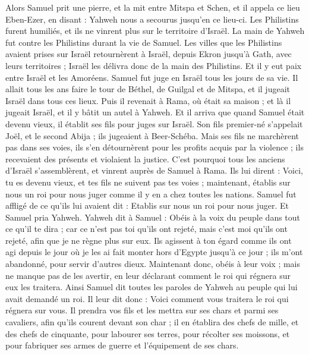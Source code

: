 \begin{multicols}{2}
Alors Samuel prit une pierre, et la mit entre Mitspa et Schen, et il appela ce lieu Eben-Ezer, en disant : Yahweh nous a secourus jusqu'en ce lieu-ci.
Les Philistins furent humiliés, et ils ne vinrent plus sur le territoire d'Israël. La main de Yahweh fut contre les Philistins durant la vie de Samuel.
Les villes que les Philistins avaient prises sur Israël retournèrent à Israël, depuis Ekron jusqu'à Gath, avec leurs territoires ; Israël les délivra donc de la main des Philistins. Et il y eut paix entre Israël et les Amoréens.
Samuel fut juge en Israël tous les jours de sa vie.
Il allait tous les ans faire le tour de Béthel, de Guilgal et de Mitspa, et il jugeait Israël dans tous ces lieux.
Puis il revenait à Rama, où était sa maison ; et là il jugeait Israël, et il y bâtit un autel à Yahweh.
\VerseOne{}Et il arriva que quand Samuel était devenu vieux, il établit ses fils pour juges sur Israël.
Son fils premier-né s'appelait Joël, et le second Abija ; ils jugeaient à Beer-Schéba.
Mais ses fils ne marchèrent pas dans ses voies, ils s'en détournèrent pour les profits acquis par la violence ; ils recevaient des présents et violaient la justice.
C'est pourquoi tous les anciens d'Israël s'assemblèrent, et vinrent auprès de Samuel à Rama.
Ils lui dirent : Voici, tu es devenu vieux, et tes fils ne suivent pas tes voies ; maintenant, établis sur nous un roi pour nous juger comme il y en a chez toutes les nations.
Samuel fut affligé de ce qu'ils lui avaient dit : Etablis sur nous un roi pour nous juger. Et Samuel pria Yahweh.
Yahweh dit à Samuel : Obéis à la voix du peuple dans tout ce qu'il te dira ; car ce n'est pas toi qu'ils ont rejeté, mais c'est moi qu'ils ont rejeté, afin que je ne règne plus sur eux.
Ils agissent à ton égard comme ils ont agi depuis le jour où je les ai fait monter hors d'Egypte jusqu'à ce jour ; ils m'ont abandonné, pour servir d'autres dieux.
Maintenant donc, obéis à leur voix ; mais ne manque pas de les avertir, en leur déclarant comment le roi qui régnera sur eux les traitera.
Ainsi Samuel dit toutes les paroles de Yahweh au peuple qui lui avait demandé un roi.
Il leur dit donc : Voici comment vous traitera le roi qui régnera sur vous. Il prendra vos fils et les mettra sur ses chars et parmi ses cavaliers, afin qu'ils courent devant son char ;
il en établira des chefs de mille, et des chefs de cinquante, pour labourer ses terres, pour récolter ses moissons, et pour fabriquer ses armes de guerre et l'équipement de ses chars.

\end{multicols}
